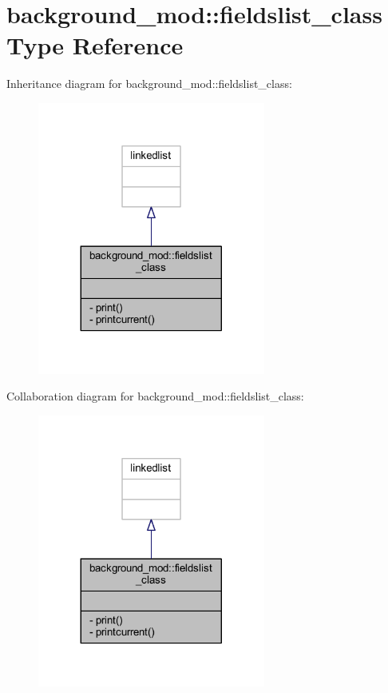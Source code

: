 \hypertarget{structbackground__mod_1_1fieldslist__class}{}\section{background\+\_\+mod\+:\+:fieldslist\+\_\+class Type Reference}
\label{structbackground__mod_1_1fieldslist__class}


Inheritance diagram for background\+\_\+mod\+:\+:fieldslist\+\_\+class\+:\nopagebreak
\begin{figure}[H]
\begin{center}
\leavevmode
\includegraphics[width=212pt]{structbackground__mod_1_1fieldslist__class__inherit__graph}
\end{center}
\end{figure}


Collaboration diagram for background\+\_\+mod\+:\+:fieldslist\+\_\+class\+:\nopagebreak
\begin{figure}[H]
\begin{center}
\leavevmode
\includegraphics[width=212pt]{structbackground__mod_1_1fieldslist__class__coll__graph}
\end{center}
\end{figure}
